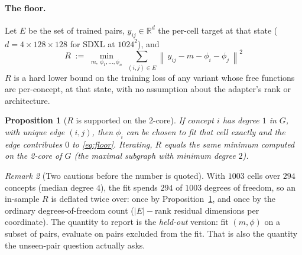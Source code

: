 \documentclass[11pt]{article}
\newcommand{\R}{\mathbb{R}}
\newcommand{\norm}[1]{\left\lVert #1 \right\rVert}
\theoremstyle{plain}
\newtheorem{proposition}{Proposition}
\theoremstyle{remark}
\newtheorem{remark}[proposition]{Remark}
\begin{document}
\paragraph{The floor.}
Let $E$ be the set of trained pairs, $y_{ij} \in \R^{d}$ the per-cell target at that state
($d = 4 \times 128 \times 128$ for SDXL at $1024^2$), and
\begin{equation}
  \boxed{\;
  R \;:=\; \min_{m,\ \phi_1,\dots,\phi_n}\ \sum_{(i,j)\in E}
  \norm{\,y_{ij} - m - \phi_i - \phi_j\,}^2 \;}
  \label{eq:floor}
\end{equation}
$R$ is a hard lower bound on the training loss of any variant whose free functions are
per-concept, at that state, with no assumption about the adapter's rank or architecture.

\begin{proposition}[$R$ is supported on the 2-core]
\label{prop:core}
If concept $i$ has degree $1$ in $G$, with unique edge $(i,j)$, then $\phi_i$ can be chosen to
fit that cell exactly and the edge contributes $0$ to \eqref{eq:floor}. Iterating, $R$ equals
the same minimum computed on the 2-core of $G$ (the maximal subgraph with minimum degree $2$).
\end{proposition}

\begin{remark}[Two cautions before the number is quoted]
With $1003$ cells over $294$ concepts (median degree $4$), the fit spends $294$ of $1003$
degrees of freedom, so an in-sample $R$ is deflated twice over: once by
Proposition~\ref{prop:core}, and once by the ordinary degrees-of-freedom count
($|E| - \mathrm{rank}$ residual dimensions per coordinate). The quantity to report is the
\emph{held-out} version: fit $(m,\phi)$ on a subset of pairs, evaluate on pairs excluded from
the fit. That is also the quantity the unseen-pair question actually asks.
\end{remark}
\end{document}
